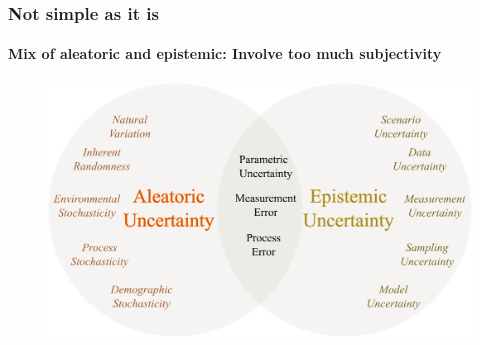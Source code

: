 \begin{frame}
\frametitle{Not simple as it is}
\framesubtitle{Mix of aleatoric and epistemic: Involve too much subjectivity}
\begin{figure}
\includegraphics[scale=0.3]{figures/figure-uncertainty_classification.pdf}
\end{figure}
\end{frame}

